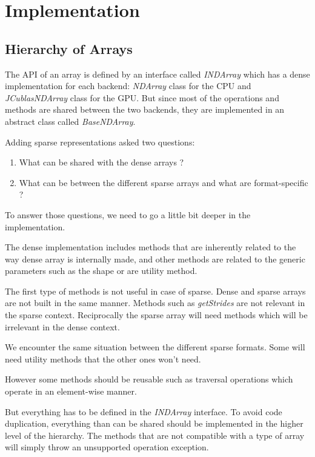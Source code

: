 \chapter{Implementation}


\section{Hierarchy of Arrays}

The API of an array is defined by an interface called \textit{INDArray} which has a dense implementation for each backend: \textit{NDArray} class for the CPU and \textit{JCublasNDArray} class for the GPU. But since most of the operations and methods are shared between the two backends, they are implemented in an abstract class called \textit{BaseNDArray}.

Adding sparse representations asked two questions:
\begin{enumerate}
 	\item What can be shared with the dense arrays ?
	\item What can be between the different sparse arrays and what are format-specific ?
\end{enumerate}

To answer those questions, we need to go a little bit deeper in the implementation. 

The dense implementation includes methods that are inherently related to the way dense array is internally made, and other methods are related to the generic parameters such as the shape or are utility method.

The first type of methods is not useful in case of sparse. Dense and sparse arrays are not built in the same manner. Methods such as \textit{getStrides} are not relevant in the sparse context. Reciprocally the sparse array will need methods which will be irrelevant in the dense context.

We encounter the same situation between the different sparse formats. Some will need utility methods that the other ones won't need.

However some methods should be reusable such as traversal operations which operate in an element-wise manner.

But everything has to be defined in the \textit{INDArray} interface. To avoid code duplication, everything than can be shared should be implemented in the higher level of the hierarchy. The methods that are not compatible with a type of array will simply throw an unsupported operation exception.

